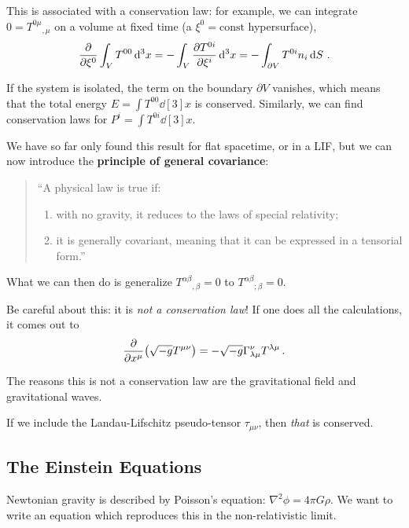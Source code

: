 \documentclass[main.tex]{subfiles}
\begin{document}
This is associated with a conservation law: for example, we can integrate \(0 = T^{0 \mu }{}_{, \mu }\) on a volume at fixed time (a \(\xi^{0} = \text{const}\) hypersurface), 
%
\begin{align}
\pdv{}{\xi^{0}} \int_V T^{00} \dd[3]{x} = - \int_V \pdv{T^{0i}}{\xi^{i}} \dd[3]{x} = - \int _{\partial V} T^{0i} n_i \dd{S}
\,.
\end{align}

If the system is isolated, the term on the boundary \(\partial V\) vanishes, which means that the total energy \(E = \int T^{00} \dd[3]{x}\) is conserved. 
Similarly, we can find conservation laws for \(P^{i} = \int T^{0i} \dd[3]{x}\). 

We have so far only found this result for flat spacetime, or in a LIF, but we can now introduce the \textbf{principle of general covariance}: 

\begin{quotation}
    ``A physical law is true if: 
    \begin{enumerate}
        \item with no gravity, it reduces to the laws of special relativity;
        \item it is generally covariant, meaning that it can be expressed in a tensorial form.''
    \end{enumerate}
\end{quotation}

What we can then do is generalize \(T^{\alpha \beta }{}_{, \beta } = 0\) to \(T^{\alpha \beta }{}_{; \beta } = 0\).

Be careful about this: it is \emph{not a conservation law}! 
If one does all the calculations, it comes out to 
%
\begin{align}
\pdv{}{x^{\mu }} \qty(\sqrt{-g} T^{\mu \nu }) = - \sqrt{-g} \Gamma^{\nu }_{\lambda \mu } T^{\lambda \mu }
\,.
\end{align}

The reasons this is not a conservation law are the gravitational field and gravitational waves. 

If we include the Landau-Lifschitz pseudo-tensor \(\tau_{\mu \nu }\), then \emph{that} is conserved. 

\subsection{The Einstein Equations}

Newtonian gravity is described by Poisson's equation: \(\nabla^2 \phi = 4 \pi G \rho \). 
We want to write an equation which reproduces this in the non-relativistic limit. 
\end{document}
